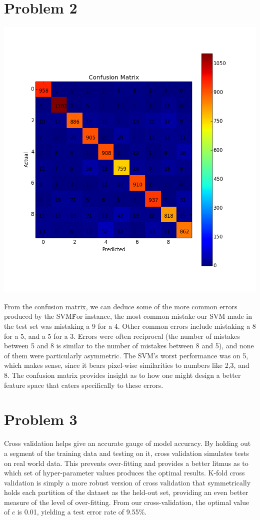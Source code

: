 \documentclass[10pt]{article}
\begin{document}
\section{Problem 2}
\begin{center}
\includegraphics[scale=.8]{./confusionMatrix.png}
\end{center}
From the confusion matrix, we can deduce some of the more common errors produced by the SVM\. For instance, the most common mistake our SVM made in the test set was mistaking a 9 for a 4. Other common errors include mistaking a 8 for a 5, and a 5 for a 3. Errors were often reciprocal (the number of mistakes between 5 and 8 is similar to the number of mistakes between 8 and 5), and none of them were particularly asymmetric. The SVM's worst performance was on 5, which makes sense, since it bears pixel-wise similarities to numbers like 2,3, and 8. The confusion matrix provides insight as to how one might design a better feature space that caters specifically to these errors.
\section{Problem 3}
Cross validation helps give an accurate gauge of model accuracy. By holding out a segment of the training data and testing on it, cross validation simulates tests on real world data. This prevents over-fitting and provides a better litmus as to which set of hyper-parameter values produces the optimal results. K-fold cross validation is simply a more robust version of cross validation that symmetrically holds each partition of the dataset as the held-out set, providing an even better measure of the level of over-fitting. 
From our cross-validation, the optimal value of $c$ is 0.01, yielding a test error rate of 9.55\%.
\end{document}
